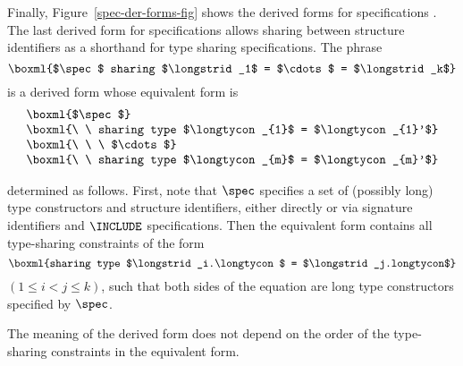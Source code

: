 Finally, Figure~\ref{spec-der-forms-fig} shows the derived forms for specifications .
The last derived form for specifications allows sharing between structure
identifiers as a shorthand for type sharing specifications. 
The phrase
\[
\boxml{$\spec$ sharing $\longstrid_1$ = $\cdots$ = $\longstrid_k$}
\]
is a derived form whose equivalent form is
\[\begin{array}{l}
  \boxml{$\spec$}\cr
  \boxml{\ \ sharing type $\longtycon_{1}$ =  $\longtycon_{1}'$}\cr
  \boxml{\ \ \ $\cdots$}\cr
  \boxml{\ \ sharing type $\longtycon_{m}$ =  $\longtycon_{m}'$}\cr
\end{array}\]

\noindent
determined as follows. 
First, note that  $\spec$  specifies a set of 
(possibly long) type constructors and structure identifiers, either 
directly or via signature identifiers and $\INCLUDE$ specifications.  
Then the equivalent form contains all type-sharing constraints 
of the form 
\[
\boxml{sharing type $\longstrid_i.\longtycon$ = $\longstrid_j.longtycon$}
\]
$(1\leq i<j\leq k)$,  such that both sides of the equation are long type 
constructors specified by  $\spec$. 

The meaning of the derived form does not depend on the order of the 
type-sharing constraints in the equivalent form.


